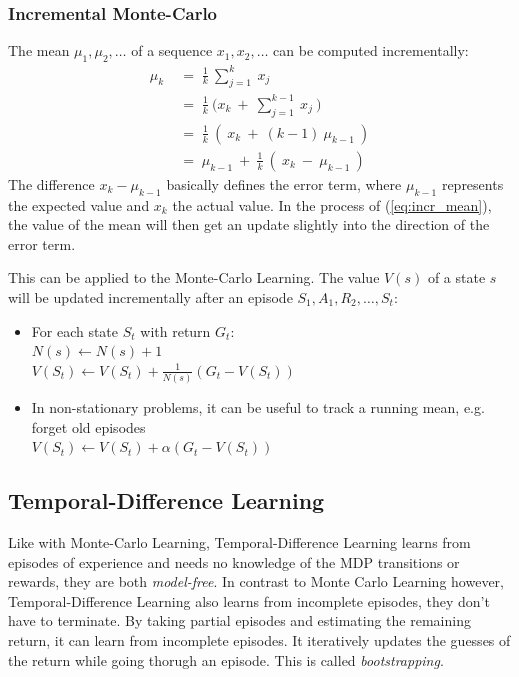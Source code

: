 \documentclass[10pt]{article}
\begin{document}
\subsubsection*{Incremental Monte-Carlo}
The mean $\mu_{1}, \mu_{2}, \ldots$ of a sequence $x_{1}, x_{2}, \ldots$ can be computed incrementally:
\begin{equation}
\begin{aligned}
\mu_{k}\; &=\;\frac{1}{k}\:\sum_{j=1}^{k}\:x_{j}\\
&=\;\frac{1}{k}\:\big( x_{k} \:+\: \sum_{j=1}^{k-1}\:x_{j}\: \big) \\
&=\;\frac{1}{k}\:(\:x_{k} \: + \: (k-1)\:\mu_{k-1} \: )\\
&=\; \mu_{k-1} \: + \: \frac{1}{k}\:(\:x_{k} \: - \:\mu_{k-1} \: )
\end{aligned}
\label{eq:incr_mean}
\end{equation}
The difference $x_{k} - \mu_{k-1}$ basically defines the error term, where $\mu_{k-1}$ represents the expected value and $x_{k}$ the actual value. In the process of (\ref{eq:incr_mean}), the value of the mean will then get an update slightly into the direction of the error term.

This can be applied to the Monte-Carlo Learning. The value $V(s)$ of a state $s$ will be updated incrementally after an episode $S_{1}, A_{1}, R_{2}, \ldots, S_{t}$:
\begin{itemize}
\item For each state $S_{t}$ with return $G_{t}$: \\
$N(s) \leftarrow N(s) + 1$ \\
$V(S_{t}) \leftarrow V(S_{t}) + \frac{1}{N(s)} (G_{t} - V(S_{t}))$
\item In non-stationary problems, it can be useful to track a running mean, e.g. forget old episodes \\
$V(S_{t}) \leftarrow V(S_{t}) + \alpha (G_{t} - V(S_{t}))$
\end{itemize}

\subsection{Temporal-Difference Learning}
Like with Monte-Carlo Learning, Temporal-Difference Learning learns from episodes of experience and needs no knowledge of the MDP transitions or rewards, they are both \textit{model-free}. In contrast to Monte Carlo Learning however, Temporal-Difference Learning also learns from incomplete episodes, they don't have to terminate. By taking partial episodes and estimating the remaining return, it can learn from incomplete episodes. It iteratively updates the guesses of the return while going thorugh an episode. This is called \textit{bootstrapping}.
\end{document}
